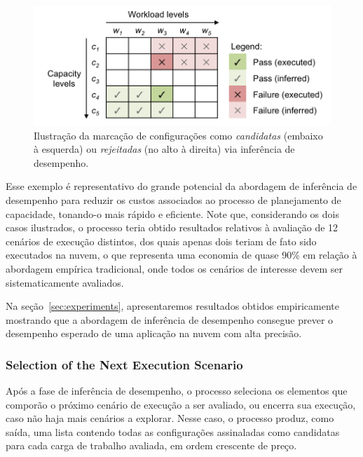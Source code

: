 \documentclass[10pt,conference,compsocconf]{IEEEtran}
\begin{document}
\begin{figure}[t]
  \begin{center}
    \includegraphics[trim = 0mm 0mm 0mm 0mm, scale=.55]{img/inference}
  \end{center}
  \caption{\label{fig:fig_processo_inferencia}Ilustração da marcação de configurações como {\em candidatas} (embaixo à esquerda) ou {\em rejeitadas} (no alto à direita) via inferência de desempenho.}
\end{figure}


Esse exemplo é representativo do grande potencial da abordagem de inferência de desempenho para reduzir os custos associados ao processo de planejamento de capacidade, tonando-o mais rápido e eficiente. Note que, considerando os dois casos ilustrados, o processo teria obtido resultados relativos à avaliação de 12 cenários de execução distintos, dos quais apenas dois teriam de fato sido executados na nuvem, o que representa uma economia de quase 90\% em relação à abordagem empírica tradicional, onde todos os cenários de interesse devem ser sistematicamente avaliados.

Na seção~\ref{sec:experiments}, apresentaremos resultados obtidos empiricamente mostrando que a abordagem de inferência de desempenho consegue prever o desempenho esperado de uma aplicação na nuvem com alta precisão. 

\subsubsection{Selection of the Next Execution Scenario}

Após a fase de inferência de desempenho, o processo seleciona os elementos que comporão o próximo cenário de execução a ser avaliado, ou encerra sua execução, caso não haja mais cenários a explorar. Nesse caso, o processo produz, como saída, uma lista contendo todas as configurações assinaladas como candidatas para cada carga de trabalho avaliada, em ordem crescente de preço.
\end{document}
